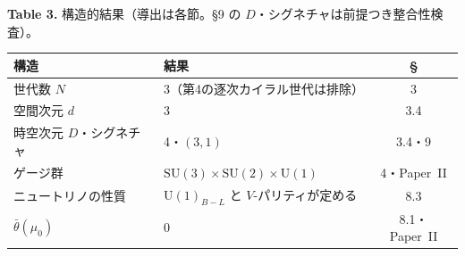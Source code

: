 \documentclass[fontsize=11pt,paper=a4,lualatex]{jlreq}
\begin{document}
\bigskip
\begin{center}\textbf{Table 3.} 構造的結果（導出は各節。\S9 の $D$・シグネチャは前提つき整合性検査）。\end{center}
\nopagebreak[4]\smallskip\nopagebreak[4]
\begin{center}\footnotesize
\begin{tabular}{@{}llc@{}}
\toprule
構造 & 結果 & \S \\
\midrule
世代数 $N$ & 3（第4の逐次カイラル世代は排除） & 3 \\
空間次元 $d$ & 3 & 3.4 \\
時空次元 $D$・シグネチャ & 4・$(3,1)$ & 3.4・9 \\
ゲージ群 & $\mathrm{SU}(3){\times}\mathrm{SU}(2){\times}\mathrm{U}(1)$ & 4・Paper~II \\
ニュートリノの性質 & $\mathrm{U}(1)_{B-L}$ と $V$-パリティが定める & 8.3 \\
$\bar\theta(\mu_0)$ & 0 & 8.1・Paper~II \\
\bottomrule
\end{tabular}
\end{center}
\end{document}
